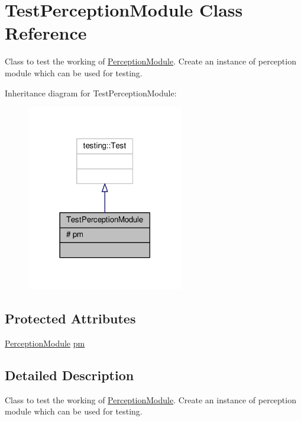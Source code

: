 \hypertarget{class_test_perception_module}{}\section{Test\+Perception\+Module Class Reference}
\label{class_test_perception_module}


Class to test the working of \hyperlink{class_perception_module}{Perception\+Module}. Create an instance of perception module which can be used for testing.  




Inheritance diagram for Test\+Perception\+Module\+:\nopagebreak
\begin{figure}[H]
\begin{center}
\leavevmode
\includegraphics[width=194pt]{class_test_perception_module__inherit__graph}
\end{center}
\end{figure}
\subsection*{Protected Attributes}
\begin{DoxyCompactItemize}
\item 
\hyperlink{class_perception_module}{Perception\+Module} \hyperlink{class_test_perception_module_a71860459e03b86cd747f283436bcd757}{pm}
\end{DoxyCompactItemize}


\subsection{Detailed Description}
Class to test the working of \hyperlink{class_perception_module}{Perception\+Module}. Create an instance of perception module which can be used for testing. 

